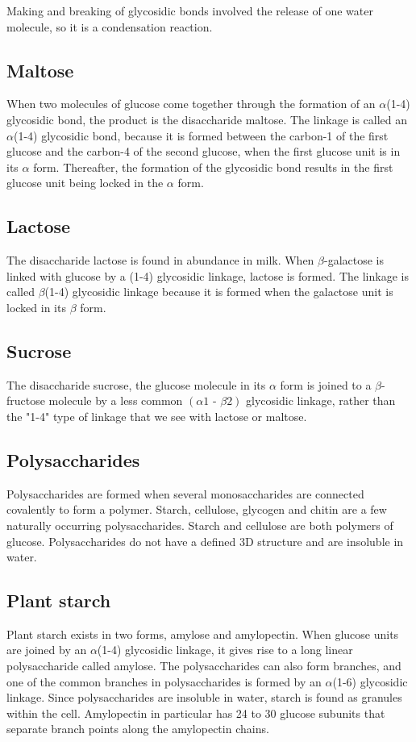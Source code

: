 \documentclass[11pt]{article}
\begin{document}
Making and breaking of glycosidic bonds involved the release of one water molecule, so it is a condensation reaction.
\subsection{Maltose}
\label{sec:org394f100}
When two molecules of glucose come together through the formation of an \(\alpha\)(1-4) glycosidic bond, the product is the disaccharide maltose. The linkage is called an \(\alpha\)(1-4) glycosidic bond, because it is formed between the carbon-1 of the first glucose and the carbon-4 of the second glucose, when the first glucose unit is in its \(\alpha\) form. Thereafter, the formation of the glycosidic bond results in the first glucose unit being locked in the \(\alpha\) form.
\subsection{Lactose}
\label{sec:org9b79d92}
The disaccharide lactose is found in abundance in milk. When \(\beta\)-galactose is linked with glucose by a (1-4) glycosidic linkage, lactose is formed. The linkage is called \(\beta\)(1-4) glycosidic linkage because it is formed when the galactose unit is locked in its \(\beta\) form.
\subsection{Sucrose}
\label{sec:orgb2b1a09}
The disaccharide sucrose, the glucose molecule in its \(\alpha\) form is joined to a \(\beta\)-fructose molecule by a less common \((\alpha 1 \text{ - } \beta 2)\) glycosidic linkage, rather than the "1-4" type of linkage that we see with lactose or maltose.
\subsection{Polysaccharides}
\label{sec:orga754895}
Polysaccharides are formed when several monosaccharides are connected covalently to form a polymer. Starch, cellulose, glycogen and chitin are a few naturally occurring polysaccharides. Starch and cellulose are both polymers of glucose. Polysaccharides do not have a defined 3D structure and are insoluble in water.
\subsection{Plant starch}
\label{sec:org7426fd7}
Plant starch exists in two forms, amylose and amylopectin. When glucose units are joined by an \(\alpha\)(1-4) glycosidic linkage, it gives rise to a long linear polysaccharide called amylose. The polysaccharides can also form branches, and one of the common branches in polysaccharides is formed by an \(\alpha\)(1-6) glycosidic linkage. Since polysaccharides are insoluble in water, starch is found as granules within the cell. Amylopectin in particular has 24 to 30 glucose subunits that separate branch points along the amylopectin chains.
\end{document}
